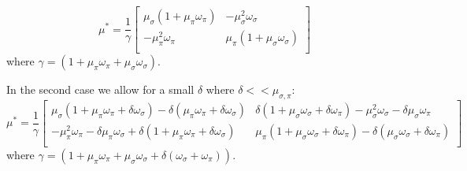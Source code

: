 \begin{equation}
\mu^{*} = \frac{1}{\gamma}
\begin{bmatrix}
\mu_{\sigma}(1 + \mu_{\pi}\omega_{\pi}) &  -\mu_{\sigma}^{2}\omega_{\sigma}        \\
      -\mu_{\pi}^{2}\omega_{\pi}     & \mu_{\pi}(1+ \mu_{\sigma}\omega_{\sigma}) \\
\end{bmatrix}
\end{equation}
%
where $\gamma=(1+ \mu_{\pi}\omega_{\pi} + \mu_{\sigma}\omega_{\sigma})$.

In the second case we allow for a small $\delta$ where $\delta<<\mu_{\sigma,\pi}$:
%
\begin{equation}
\mu^{*} = \frac{1}{\gamma}
\begin{bmatrix}
\mu_{\sigma}(1 + \mu_{\pi}\omega_{\pi} + \delta \omega_{\sigma}) - \delta(\mu_{\pi}\omega_{\pi} + \delta\omega_{\sigma}) 
& \delta(1+\mu_{\sigma}\omega_{\sigma}+\delta\omega_{\pi}) - \mu_{\sigma}^{2}\omega_{\sigma}-\delta\mu_{\sigma}\omega_{\pi} \\
-\mu_{\pi}^{2}\omega_{\pi}-\delta\mu_{\pi}\omega_{\sigma} +\delta(1+\mu_{\pi}\omega_{\pi}+\delta\omega_{\sigma})  & \mu_{\pi}(1+ \mu_{\sigma}\omega_{\sigma} + \delta\omega_{\pi})
-\delta(\mu_{\sigma}\omega_{\sigma}+\delta\omega_{\pi}) \\
\end{bmatrix}
\end{equation}
%
where $\gamma=(1+\mu_{\pi}\omega_{\pi}+\mu_{\sigma}\omega_{\sigma}+\delta(\omega_{\sigma}+\omega_{\pi}))$.

